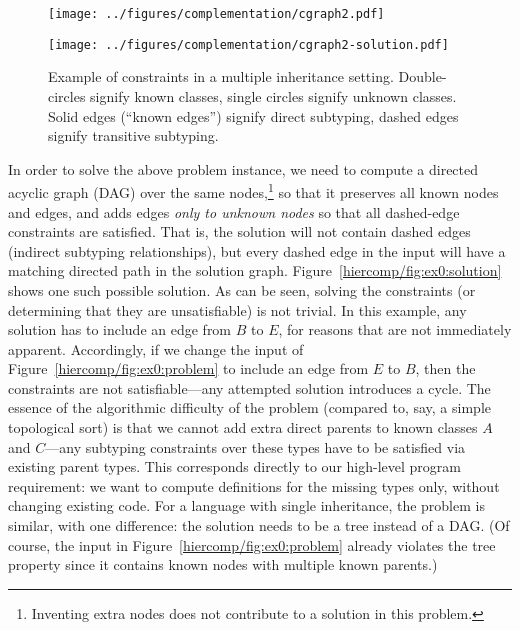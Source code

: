 \documentclass{llncs}
\begin{document}
\begin{figure}[ht]
  \begin{minipage}[b]{.5\linewidth}
    \centering
    \texttt{[image: ../figures/complementation/cgraph2.pdf]}
    \label{hiercomp/fig:ex0:problem}
  \end{minipage}
  \begin{minipage}[b]{.5\linewidth}
    \centering
    \texttt{[image: ../figures/complementation/cgraph2-solution.pdf]}
    \label{hiercomp/fig:ex0:solution}
  \end{minipage}
  \caption[Example of constraints in a multiple inheritance setting]{%
    Example of constraints in a multiple inheritance
    setting. Double-circles signify known classes, single circles
    signify unknown classes. Solid edges (``known edges'') signify
    direct subtyping, dashed edges signify transitive subtyping.}
  \label{hiercomp/fig:ex0}
\end{figure}

In order to solve the above problem instance, we need to compute a
directed acyclic graph (DAG) over the same nodes,\footnote{Inventing
extra nodes does not contribute to a solution in this problem.} so
that it preserves all known nodes and edges, and adds edges \emph{only
to unknown nodes} so that all dashed-edge constraints are
satisfied. That is, the solution will not contain dashed edges
(indirect subtyping relationships), but every dashed edge in the input
will have a matching directed path in the solution
graph. Figure~\ref{hiercomp/fig:ex0:solution} shows one such possible solution.
As can be seen, solving the constraints (or determining that they are
unsatisfiable) is not trivial. In this example, any solution has to
include an edge from $B$ to $E$, for reasons that are not immediately
apparent. Accordingly, if we change the input of
Figure~\ref{hiercomp/fig:ex0:problem} to include an edge from $E$ to $B$, then
the constraints are not satisfiable---any attempted solution
introduces a cycle. The essence of the algorithmic difficulty of the
problem (compared to, say, a simple topological sort) is that we
cannot add extra direct parents to known classes $A$ and $C$---any
subtyping constraints over these types have to be satisfied via
existing parent types. This corresponds directly to our high-level
program requirement: we want to compute definitions for the missing
types only, without changing existing code.
%
For a language with single inheritance, the problem is similar, with
one difference: the solution needs to be a tree instead of a DAG. (Of
course, the input in Figure~\ref{hiercomp/fig:ex0:problem} already violates the
tree property since it contains known nodes with multiple known
parents.)
\end{document}
